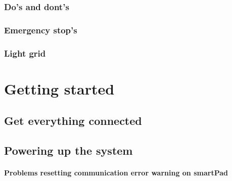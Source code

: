 \documentclass{article}
\begin{document}
        \subsubsection{Do's and dont's }
        \subsubsection{Emergency stop's}
        \subsubsection{Light grid}

\section{Getting started}
    \subsection{Get everything connected}
    \subsection{Powering up the system}
    \paragraph{Problems resetting communication error warning on smartPad}
    
\end{document}
